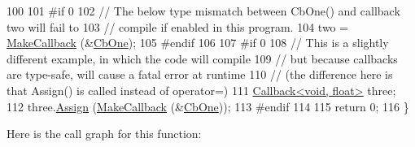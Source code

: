 \begin{DoxyCode}
100 
101 \textcolor{preprocessor}{#if 0}
102   \textcolor{comment}{// The below type mismatch between CbOne() and callback two will fail to }
103   \textcolor{comment}{// compile if enabled in this program.}
104   two = \hyperlink{group__makecallbackmemptr_ga9376283685aa99d204048d6a4b7610a4}{MakeCallback} (&\hyperlink{main-callback_8cc_a0d0f54ce19e6ffbc7b79325e2fe4d20c}{CbOne});
105 \textcolor{preprocessor}{#endif}
106 
107 \textcolor{preprocessor}{#if 0}
108   \textcolor{comment}{// This is a slightly different example, in which the code will compile}
109   \textcolor{comment}{// but because callbacks are type-safe, will cause a fatal error at runtime }
110   \textcolor{comment}{// (the difference here is that Assign() is called instead of operator=)}
111   \hyperlink{classns3_1_1Callback}{Callback<void, float>} three;
112   three.\hyperlink{classns3_1_1Callback_a246f8949a1392269d4c1a85c24b85f97}{Assign} (\hyperlink{group__makecallbackmemptr_ga9376283685aa99d204048d6a4b7610a4}{MakeCallback} (&\hyperlink{main-callback_8cc_a0d0f54ce19e6ffbc7b79325e2fe4d20c}{CbOne}));
113 \textcolor{preprocessor}{#endif}
114 
115   \textcolor{keywordflow}{return} 0;
116 \}
\end{DoxyCode}


Here is the call graph for this function\+:


